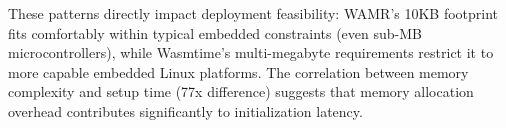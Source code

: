 These patterns directly impact deployment feasibility: WAMR's 10KB footprint fits comfortably within typical embedded constraints (even sub-MB microcontrollers), while Wasmtime's multi-megabyte requirements restrict it to more capable embedded Linux platforms. The correlation between memory complexity and setup time (77x difference) suggests that memory allocation overhead contributes significantly to initialization latency.





